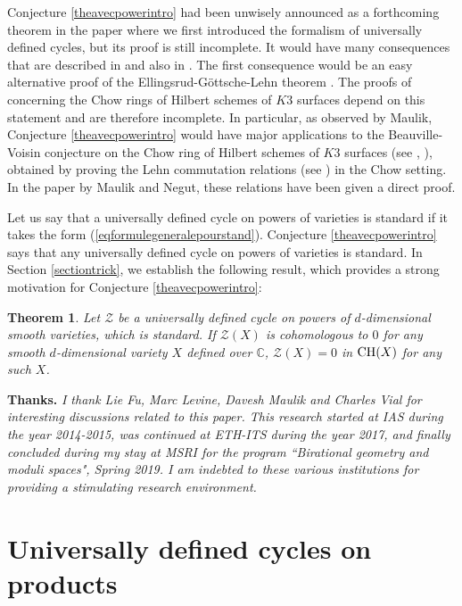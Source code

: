 \documentclass[10pt]{article}
\newtheorem{theo}{Theorem}[section]
\begin{document}
  Conjecture \ref{theavecpowerintro} had been unwisely announced as a forthcoming theorem  in the paper \cite{voisindiagonal} where we first introduced the formalism of universally defined cycles,  but its proof is still incomplete. It  would   have  many consequences
 that are described in \cite{voisinforthcoming} and also in \cite{voisindiagonal}. The first  consequence would be  an easy alternative proof of the Ellingsrud-G\"{o}ttsche-Lehn theorem \cite{EGL}. The proofs of \cite[Section 5]{voisindiagonal} concerning the Chow rings of Hilbert schemes of $K3$ surfaces depend on this statement and are therefore incomplete. In particular, as observed by Maulik,  Conjecture \ref{theavecpowerintro} would have major   applications to the  Beauville-Voisin conjecture on the Chow ring of Hilbert schemes of $K3$ surfaces (see \cite{beau}, \cite{voisinpamq}), obtained by  proving  the Lehn commutation relations (see \cite{lehn}) in the Chow setting. In the paper \cite{Mauliknegut} by Maulik and Negut, these relations  have  been given a direct proof.

Let us say that a universally defined cycle on powers of varieties is standard if it takes the form (\ref{eqformulegeneralepourstand}). Conjecture \ref{theavecpowerintro} says that any universally defined cycle on powers of varieties is standard. In  Section \ref{sectiontrick}, we establish   the following result, which provides a strong motivation for  Conjecture \ref{theavecpowerintro}:
\begin{theo}\label{corocohchow}  Let $\mathcal{Z}$ be  a universally defined cycle on powers
of $d$-dimensional smooth varieties, which is standard. If $\mathcal{Z}(X)$ is cohomologous to $0$ for any
smooth $d$-dimensional variety $X$ defined over $\mathbb{C}$, $\mathcal{Z}(X)=0$ in ${\rm CH}(X)$ for any
such $X$.
\end{theo}



\vspace{0.5cm}


{\bf Thanks.}
{\it  I thank Lie Fu, Marc Levine, Davesh Maulik and Charles Vial for interesting discussions related to this paper. This research started at IAS during the year 2014-2015, was continued at ETH-ITS during the year 2017, and finally concluded during my stay at MSRI for the program ``Birational geometry and moduli spaces", Spring  2019. I am indebted to these various institutions for providing a stimulating research environment.}
\section{Universally defined cycles on products\label{sectionsanspuissance}}
\end{document}
